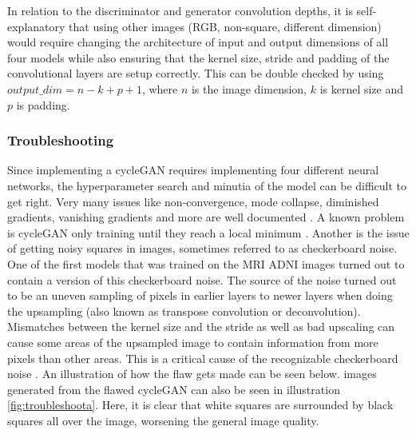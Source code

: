 \documentclass[12pt, fleqn, titlepage]{article}
\newcommand{\1}[1]{\mathds{1}\left[#1\right]}
\begin{document}
In relation to the discriminator and generator convolution depths, it is self-explanatory that using other images (RGB, non-square, different dimension) would require changing the architecture of input and output dimensions of all four models while also ensuring that the kernel size, stride and padding of the convolutional layers are setup correctly. This can be double checked by using $output\_dim = n - k + p + 1$, where $n$ is the image dimension, $k$ is kernel size and $p$ is padding.

\subsubsection{Troubleshooting}\label{troubleshooting}
Since implementing a cycleGAN requires implementing four different neural networks, the hyperparameter search and minutia of the model can be difficult to get right. Very many issues like non-convergence, mode collapse, diminished gradients, vanishing gradients and more are well documented \cite{hard_to_train}. A known problem is cycleGAN only training until they reach a local minimum \cite{ganlocalminimum}. Another is the issue of getting noisy squares in images, sometimes referred to as checkerboard noise. One of the first models that was trained on the MRI ADNI images turned out to contain a version of this checkerboard noise. The source of the noise turned out to be an uneven sampling of pixels in earlier layers to newer layers when doing the upsampling (also known as transpose convolution or deconvolution). Mismatches between the kernel size and the stride as well as bad upscaling can cause some areas of the upsampled image to contain information from more pixels than other areas. This is a critical cause of the recognizable checkerboard noise \cite{checkerboard}. An illustration of how the flaw gets made can be seen below. images generated from the flawed cycleGAN can also be seen in illustration \ref{fig:troubleshoota}. Here, it is clear that white squares are surrounded by black squares all over the image, worsening the general image quality.
\end{document}
